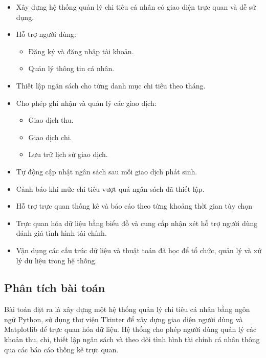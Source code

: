 \documentclass[12pt,letterpaper]{article}
\begin{document}
\begin{itemize}
\item Xây dựng hệ thống quản lý chi tiêu cá nhân có giao diện trực quan và dễ sử dụng.

\item Hỗ trợ người dùng:
\begin{itemize}
    \item Đăng ký và đăng nhập tài khoản.
    \item Quản lý thông tin cá nhân.
\end{itemize}

\item Thiết lập ngân sách cho từng danh mục chi tiêu theo tháng.
\item Cho phép ghi nhận và quản lý các giao dịch:
\begin{itemize}
    \item Giao dịch thu.
    \item Giao dịch chi.
    \item Lưu trữ lịch sử giao dịch.
\end{itemize}

\item Tự động cập nhật ngân sách sau mỗi giao dịch phát sinh.

\item Cảnh báo khi mức chi tiêu vượt quá ngân sách đã thiết lập.

\item Hỗ trợ trực quan thống kê và báo cáo theo từng khoảng thời gian tùy chọn

\item Trực quan hóa dữ liệu bằng biểu đồ và cung cấp nhận xét hỗ trợ người dùng đánh giá tình hình tài chính.

\item Vận dụng các cấu trúc dữ liệu và thuật toán đã học để tổ chức, quản lý và xử lý dữ liệu trong hệ thống.
\end{itemize}
\subsection{Phân tích bài toán}

Bài toán đặt ra là xây dựng một hệ thống quản lý chi tiêu cá nhân bằng ngôn ngữ Python, sử dụng thư viện Tkinter để xây dựng giao diện người dùng và Matplotlib để trực quan hóa dữ liệu. Hệ thống cho phép người dùng quản lý các khoản thu, chi, thiết lập ngân sách và theo dõi tình hình tài chính cá nhân thông qua các báo cáo thống kê trực quan.
\end{document}
